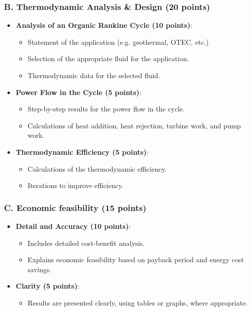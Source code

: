 \documentclass[11pt]{article}
\begin{document}
\subsubsection*{B. Thermodynamic Analysis \& Design (20 points)}
\begin{itemize}
    \item \textbf{Analysis of an Organic Rankine Cycle (10 points)}:
    \begin{itemize}
         \item Statement of the application (e.g. geothermal, OTEC, etc.)
        \item Selection of the appropriate fluid for the application.
        \item Thermodynamic data for the selected fluid.
    \end{itemize}
    \item \textbf{Power Flow in the Cycle (5 points)}:
    \begin{itemize}
         \item Step-by-step results for the power flow in the cycle.
          \item Calculations of heat addition, heat rejection, turbine work, and pump work.
    \end{itemize}
    \item \textbf{Thermodynamic Efficiency (5 points)}:
    \begin{itemize}
        \item Calculations of the thermodynamic efficiency.
        \item Iterations to improve efficiency.
    \end{itemize}
\end{itemize}

\subsubsection*{C. Economic feasibility (15 points)}
\begin{itemize}
    \item \textbf{Detail and Accuracy (10 points)}:
    \begin{itemize}
        \item Includes detailed cost-benefit analysis.
        \item Explains economic feasibility based on payback period and energy cost savings.
    \end{itemize}
    \item \textbf{Clarity (5 points)}:
    \begin{itemize}
        \item Results are presented clearly, using tables or graphs, where appropriate.
    \end{itemize}
\end{itemize}
\end{document}
